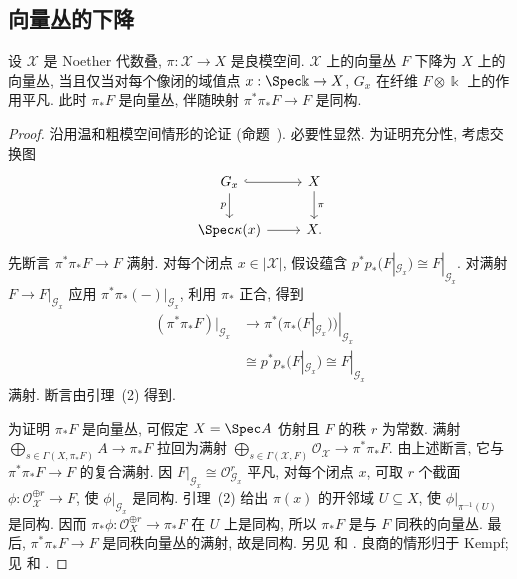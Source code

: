 \subsection{向量丛的下降}\label{src:7.5.9-subsection}
\begin{proposition}\label{src:7.5.36}
设 $\mathcal X$ 是 Noether 代数叠, $\pi:\mathcal X\to X$ 是良模空间. $\mathcal X$ 上的向量丛 $F$ 下降为 $X$ 上的向量丛, 当且仅当对每个像闭的域值点 $x:\Spec\Bbbk\to\mathcal X$, $G_x$ 在纤维 $F\otimes\Bbbk$ 上的作用平凡. 此时 $\pi_*F$ 是向量丛, 伴随映射 $\pi^*\pi_*F\to F$ 是同构.
\end{proposition}
\begin{proof}
沿用温和粗模空间情形的论证 (命题~). 必要性显然. 为证明充分性, 考虑交换图
\begin{align*}
\begin{tikzcd}[ampersand replacement=\&]
\mathcal G_x\arrow[r,hook]\arrow[d,"{p}"']\&\mathcal X\arrow[d,"{\pi}"]\\
\Spec\kappa(x)\arrow[r]\&X.
\end{tikzcd}
\end{align*}
先断言 $\pi^*\pi_*F\to F$ 满射. 对每个闭点 $x\in|\mathcal X|$, 假设蕴含 $p^*p_*(F|_{\mathcal G_x})\cong F|_{\mathcal G_x}$. 对满射 $F\to F|_{\mathcal G_x}$ 应用 $\pi^*\pi_*(-)|_{\mathcal G_x}$, 利用 $\pi_*$ 正合, 得到
\begin{align*}
(\pi^*\pi_*F)|_{\mathcal G_x}&\longrightarrow\pi^*(\pi_*(F|_{\mathcal G_x}))|_{\mathcal G_x}\\
&\cong p^*p_*(F|_{\mathcal G_x})\cong F|_{\mathcal G_x}
\end{align*}
满射. 断言由引理~(2) 得到.

为证明 $\pi_*F$ 是向量丛, 可假定 $X=\Spec A$ 仿射且 $F$ 的秩 $r$ 为常数. 满射 $\bigoplus_{s\in\Gamma(X,\pi_*F)}A\to\pi_*F$ 拉回为满射 $\bigoplus_{s\in\Gamma(\mathcal X,F)}\mathcal O_{\mathcal X}\to\pi^*\pi_*F$. 由上述断言, 它与 $\pi^*\pi_*F\to F$ 的复合满射. 因 $F|_{\mathcal G_x}\cong\mathcal O_{\mathcal G_x}^r$ 平凡, 对每个闭点 $x$, 可取 $r$ 个截面 $\phi:\mathcal O_{\mathcal X}^{\oplus r}\to F$, 使 $\phi|_{\mathcal G_x}$ 是同构. 引理~(2) 给出 $\pi(x)$ 的开邻域 $U\subseteq X$, 使 $\phi|_{\pi^{-1}(U)}$ 是同构. 因而 $\pi_*\phi:\mathcal O_X^{\oplus r}\to\pi_*F$ 在 $U$ 上是同构, 所以 $\pi_*F$ 是与 $F$ 同秩的向量丛. 最后, $\pi^*\pi_*F\to F$ 是同秩向量丛的满射, 故是同构. 另见 \cite[定理 10.3]{Alp13} 和 \cite[定理 B]{Ryd20}. 良商的情形归于 Kempf; 见 \cite[定理 2.3]{DN89} 和 \cite[命题 4.2]{KKV89}.
\end{proof}

